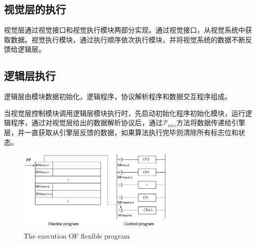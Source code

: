 \documentclass[journal,UTF8]{IEEEtran}
\begin{document}
\subsection{视觉层的执行}
视觉层通过视觉接口和视觉执行模块两部分实现。通过视觉接口，从视觉系统中获取数据。视觉执行模块，通过执行顺序依次执行模块，并将视觉系统的数据不断反馈给逻辑层。





\subsection{逻辑层执行}
逻辑层由模块数据初始化，逻辑程序，协议解析程序和数据交互程序组成。

当视觉层控制模块调用逻辑层模块执行时，先启动初始化程序初始化模块，运行逻辑程序，通过对视觉层给出的数据解析协议后，通过$\mathcal{P}_{mts}$方法将数据传递给引擎层，并一直获取从引擎层反馈的数据，如果算法执行完毕则清除所有标志位和状态。








\begin{figure}
	\centering
	\includegraphics[width=3in]{fig/execution.png}
	\caption{ The execution OF flexible program}
	\label{fig:execution}
\end{figure}
\end{document}
